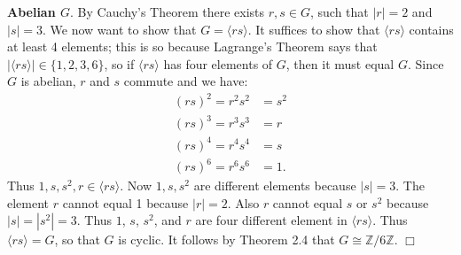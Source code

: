 \documentclass[9pt]{article}
\newcommand{\qed}{\hfill \ensuremath{\Box}}
\newcommand{\cyc}[1]{\langle #1 \rangle}
\newcommand{\Z}{\mathbb{Z}}
\begin{document}
\begin{enumerate}
      \textbf{Abelian $G$}. By Cauchy's Theorem there exists $r, s \in G$, such
      that $|r| = 2$ and $|s| = 3$. We now want to show that $G = \cyc{rs}$. It
      suffices to show that $\cyc{rs}$ contains at least 4 elements; this is so
      because Lagrange's Theorem says that $|\cyc{rs}| \in \{1, 2, 3, 6\}$, so
      if $\cyc{rs}$ has four elements of $G$, then it must equal $G$. Since
      $G$ is abelian, $r$ and $s$ commute and we have:
      \begin{align*}
         (rs)^2 = r^2s^2 &= s^2 \\
         (rs)^3 = r^3s^3 &= r \\
         (rs)^4 = r^4s^4 &= s \\
         (rs)^6 = r^6s^6 &= 1.
      \end{align*}
      Thus $1, s, s^2, r \in \cyc{rs}$. Now $1, s, s^2$ are different elements
      because $|s| = 3$. The element $r$ cannot equal 1 because $|r| = 2$. Also
      $r$ cannot equal $s$ or $s^2$ because $|s| = |s^2| = 3$. Thus $1$, $s$,
      $s^2$, and $r$ are four different element in $\cyc{rs}$. Thus $\cyc{rs} = G$, so
      that $G$ is cyclic. It follows by Theorem 2.4 that $G \cong \Z/6\Z$. \qed
\end{enumerate}
\end{document}
